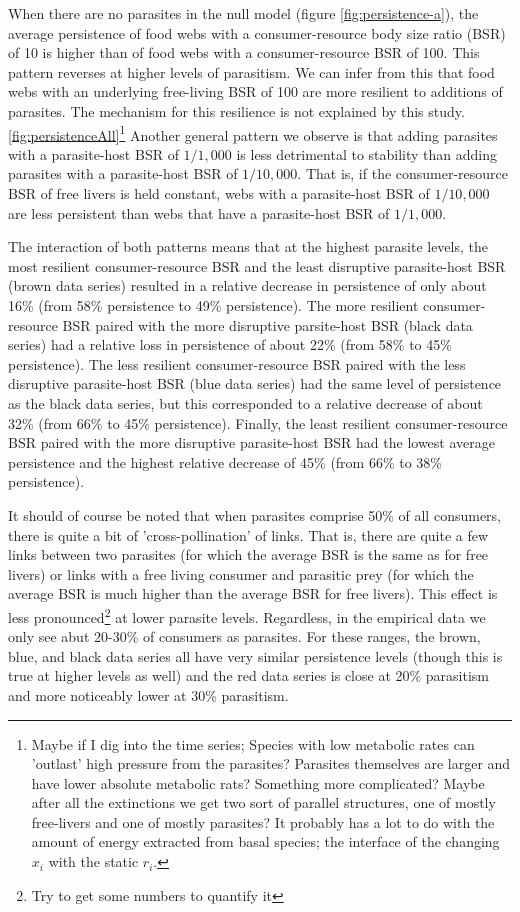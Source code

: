 \documentclass[11pt]{amsart}
\begin{document}
When there are no parasites in the null model (figure \ref{fig:persistence-a}), the average persistence of food webs with a consumer-resource body size ratio (BSR) of 10 is higher than of food webs with a consumer-resource BSR of 100.  This pattern reverses at higher levels of parasitism.  We can infer from this that food webs with an underlying free-living BSR of 100 are more resilient to additions of parasites.  The mechanism for this resilience is not explained by this study.\ref{fig:persistenceAll}\footnote{Maybe if I dig into the time series;  Species with low metabolic rates can 'outlast' high pressure from the parasites? Parasites themselves are larger and have lower absolute metabolic rats? Something more complicated?  Maybe after all the extinctions we get two sort of parallel structures, one of mostly free-livers and one of mostly parasites?  It probably has a lot to do with the amount of energy extracted from basal species; the interface of the changing $x_i$ with the static $r_i$.}   Another general pattern we observe is that adding parasites with a parasite-host BSR of $1/1,000$ is less detrimental to stability than adding parasites with a parasite-host BSR of $1/10,000$.  That is, if the consumer-resource BSR of free livers is held constant, webs with a parasite-host BSR of $1/10,000$ are less persistent than webs that have a parasite-host BSR of $1/1,000$.

The interaction of both patterns means that at the highest parasite levels, the most resilient consumer-resource BSR and the least disruptive parasite-host BSR (brown data series) resulted in a relative decrease in persistence of only about 16\% (from 58\% persistence to 49\% persistence).  The more resilient consumer-resource BSR paired with the more disruptive parsite-host BSR (black data series) had a relative loss in persistence of about 22\% (from 58\% to 45\% persistence). The less resilient consumer-resource BSR paired with the less disruptive parasite-host BSR (blue data series) had the same level of persistence as the black data series, but this corresponded to a relative decrease of about 32\% (from 66\% to 45\% persistence).  Finally, the least resilient consumer-resource BSR paired with the more disruptive parasite-host BSR had the lowest average persistence and the highest relative decrease of 45\% (from 66\% to 38\% persistence). 

It should of course be noted that when parasites comprise 50\% of all consumers, there is quite a bit of 'cross-pollination' of links.  That is, there are quite a few links between two parasites (for which the average BSR is the same as for free livers) or links with a free living consumer and parasitic prey (for which the average BSR is much higher than the average BSR for free livers).  This effect is less pronounced\footnote{Try to get some numbers to quantify it} at lower parasite levels.  Regardless, in the empirical data we only see abut 20-30\% of consumers as parasites.  For these ranges, the brown, blue, and black data series all have very similar persistence levels (though this is true at higher levels as well) and the red data series is close at 20\% parasitism and more noticeably lower at 30\% parasitism.
\end{document}
